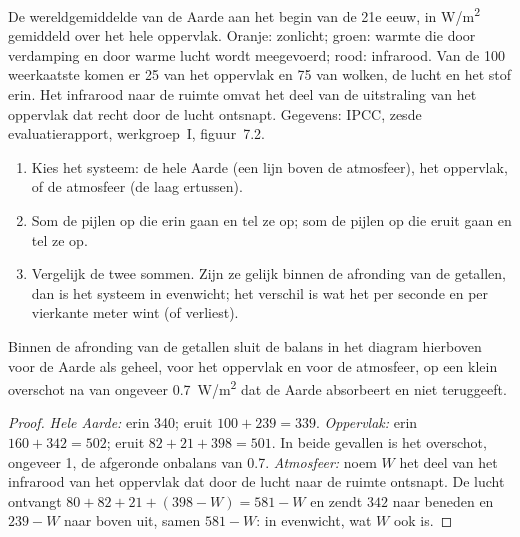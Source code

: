 \begin{omfigure}
{\small De wereldgemiddelde  van de Aarde aan het begin van de
21e eeuw, in \unit{W/m^2} gemiddeld over het hele oppervlak. Oranje: zonlicht;
groen: warmte die door verdamping en door warme lucht wordt meegevoerd; rood:
infrarood. Van de 100 weerkaatste komen er 25 van het oppervlak en 75 van
wolken, de lucht en het stof erin. Het infrarood naar de ruimte omvat het deel
van de uitstraling van het oppervlak dat recht door de lucht ontsnapt.
Gegevens: IPCC, zesde evaluatierapport, werkgroep~I, figuur~7.2.}
\end{omfigure}

\begin{method}\label{met:g10:earth-energy-budget:reading}
\begin{enumerate}
  \item Kies het systeem: de hele Aarde (een lijn boven de atmosfeer), het
        oppervlak, of de atmosfeer (de laag ertussen).
  \item Som de pijlen op die erin gaan en tel ze op; som de pijlen op die
        eruit gaan en tel ze op.
  \item Vergelijk de twee sommen. Zijn ze gelijk binnen de afronding van de
        getallen, dan is het systeem in evenwicht; het verschil is wat het per
        seconde en per vierkante meter wint (of verliest).
\end{enumerate}
\end{method}

\begin{proposition}\label{prop:g10:earth-energy-budget:balance}
Binnen de afronding van de getallen sluit de balans in het diagram hierboven
voor de Aarde als geheel, voor het oppervlak en voor de atmosfeer, op een klein
overschot na van ongeveer \qty{0.7}{W/m^2} dat de Aarde absorbeert en niet
teruggeeft.
\end{proposition}

\begin{proof}
\emph{Hele Aarde:} erin 340; eruit $100 + 239 = 339$. \emph{Oppervlak:} erin
$160 + 342 = 502$; eruit $82 + 21 + 398 = 501$. In beide gevallen is het
overschot, ongeveer 1, de afgeronde onbalans van 0.7. \emph{Atmosfeer:} noem $W$
het deel van het infrarood van het oppervlak dat door de lucht naar de ruimte
ontsnapt. De lucht ontvangt $80 + 82 + 21 + (398 - W) = 581 - W$ en zendt
$342$ naar beneden en $239 - W$ naar boven uit, samen $581 - W$: in evenwicht,
wat $W$ ook is.
\end{proof}

